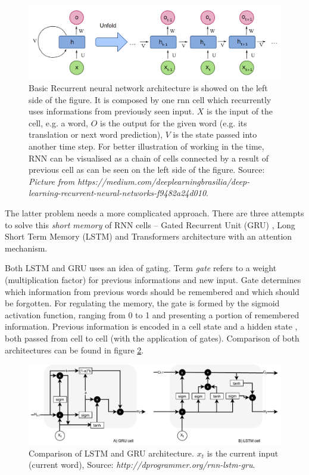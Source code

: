 \begin{figure}[H]
\centering
\includegraphics[width=1\columnwidth]{../img/rnn}
\protect\caption{Basic Recurrent neural network architecture is showed on the left side of the figure. It is composed by one rnn cell which recurrently uses informations from previously seen input. $X$ is the input of the cell, e.g. a word, $O$ is the output for the given word (e.g. its translation or next word prediction), $V$ is the state passed into another time step. For better illustration of working in the time, RNN can be visualised as a chain of cells connected by a result of previous cell as can be seen on the left side of the figure. Source: \textit{Picture from https://medium.com/deeplearningbrasilia/deep-learning-recurrent-neural-networks-f9482a24d010}.}
\label{pic:rnn}
\end{figure}

The latter problem needs a more complicated approach. There are three attempts to solve this \textit{short memory} of RNN cells -- Gated Recurrent Unit (GRU) \citep{Cho2014}, Long Short Term Memory (LSTM) \citep{Hochreiter1997} and Transformers architecture \citep{Vaswani2017} with an attention mechanism.
\par
Both LSTM and GRU uses an idea of gating. Term \textit{gate} refers to a weight (multiplication factor) for previous informations and new input. Gate determines which information from previous words should be remembered and which should be forgotten. For regulating the memory, the gate is formed by the sigmoid activation function, ranging from 0 to 1 and presenting a portion of remembered information. Previous information is encoded in a cell state and a hidden state %
, both passed from cell to cell (with the application of gates). Comparison of both architectures can be found in figure \ref{pic:lstm_gru}.

\begin{figure}[H]
\centering
\includegraphics[width=1\columnwidth]{../img/rnn_lstm_gru}
\protect\caption{Comparison of LSTM and GRU architecture. $x_t$ is the current input (current word),  Source: \textit{http://dprogrammer.org/rnn-lstm-gru}.}
\label{pic:lstm_gru}
\end{figure}
